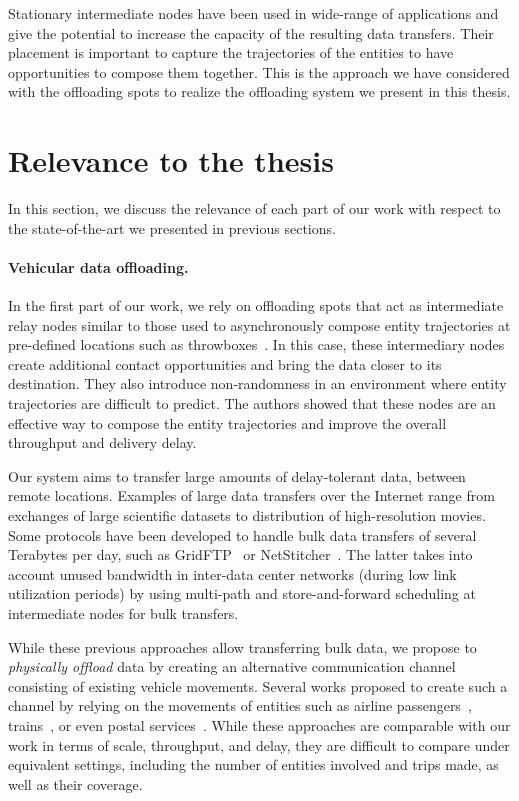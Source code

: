 Stationary intermediate nodes have been used in wide-range of applications and give the potential to increase the capacity of the resulting data transfers. Their placement is important to capture the trajectories of the entities to have opportunities to compose them together. This is the approach we have considered with the offloading spots to realize the offloading system we present in this thesis. 


\section{Relevance to the thesis}

In this section, we discuss the relevance of each part of our work with respect to the state-of-the-art we presented in previous sections. 

\paragraph{Vehicular data offloading.} 
In the first part of our work, we rely on offloading spots that act as intermediate relay nodes similar to those used to asynchronously compose entity trajectories at pre-defined locations such as throwboxes~\cite{zhao2006capacity}. In this case, these intermediary nodes create additional contact opportunities and bring the data closer to its destination. They also introduce non-randomness in an environment where entity trajectories are difficult to predict. The authors showed that these nodes are an effective way to compose the entity trajectories and improve the overall throughput and delivery delay.

Our system aims to transfer large amounts of delay-tolerant data, between remote locations. Examples of large data transfers over the Internet range from exchanges of large scientific datasets to distribution of high-resolution movies. Some protocols have been developed to handle bulk data transfers of several  Terabytes per day, such as GridFTP~\cite{allcock2003gridftp} or NetStitcher~\cite{laoutaris2011inter}. The latter takes into account unused bandwidth in inter-data center networks (during low link utilization periods) by using multi-path and store-and-forward scheduling at intermediate nodes for bulk transfers.

While these previous approaches allow transferring bulk data, we propose to \textit{physically offload} data by creating an alternative communication channel consisting of existing vehicle movements. Several works proposed to create such a channel by relying on the movements of entities such as airline passengers~\cite{keranen2009dtn}, trains~\cite{zarafshan2010trainnet}, or even postal services~\cite{wang2004turning,cho2011budget,laoutaris2013delay}. While these approaches are comparable with our work in terms of scale, throughput, and delay, they are difficult to compare under equivalent settings, including the number of entities involved and trips made, as well as their coverage.

